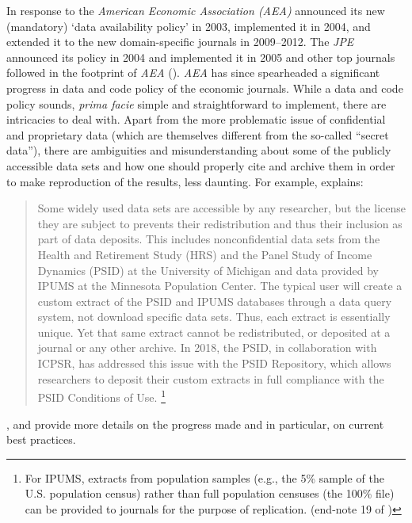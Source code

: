 \documentclass[11pt]{article}
\begin{document}
In response to \cite{mccullough2003verifying} the \textit{American Economic Association (AEA)} announced
its new (mandatory) ‘data availability policy’ in 2003, implemented it in 2004, and extended it to the new domain-specific
journals in 2009–2012. The \textit{JPE} announced its
policy in 2004 and implemented it in 2005 and other top journals followed in the footprint of \textit{AEA} (\cite{vilhuber2020reproducibility}). \textit{AEA} has since spearheaded a significant progress in data and code policy of the economic journals. While a data and code policy sounds, \textit{prima facie} simple and straightforward to implement, there are intricacies to deal with. Apart from the more problematic issue of confidential and proprietary data (which are themselves different from the so-called ``secret data''), there are ambiguities and misunderstanding about some of the publicly accessible data sets and how one should properly cite and archive them in order to make reproduction of the results, less daunting. For example, \cite{vilhuber2020reproducibility} explains:
\begin{quotation}
Some widely used data sets are accessible by any researcher, but the license they are subject to prevents their
redistribution and thus their inclusion as part of data deposits. This includes nonconfidential data sets from the
Health and Retirement Study (HRS) and the Panel Study of Income Dynamics (PSID) at the University of
Michigan and data provided by IPUMS at the Minnesota Population Center. The typical user will create a custom extract of the PSID and IPUMS databases through a data query system, not download specific data sets. Thus, each extract is essentially unique. Yet that same extract cannot be redistributed, or deposited at a journal or any other archive. In 2018, the PSID, in collaboration with ICPSR, has addressed this issue with the PSID Repository, which allows researchers to deposit their custom extracts in full compliance with the PSID Conditions of Use. \footnote{For IPUMS, extracts from population samples (e.g., the 5\% sample of the U.S. population census) rather
than full population censuses (the 100\% file) can be provided to journals for the purpose of replication. (end-note 19 of \cite{vilhuber2020reproducibility})} 
\end{quotation}

\cite{vilhuber2020reproducibility}, \cite{vilhuber2023Reinforcing} and \cite{vilhuber2023reproducibility} provide more details on the progress made and in particular, on current best practices.
\end{document}
